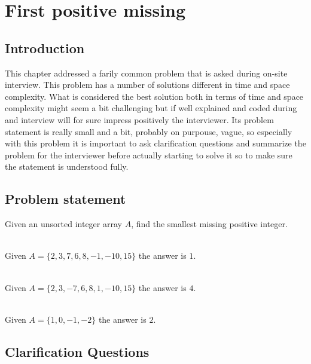 %

\chapter{First positive missing}
\label{ch:first_positive_missing}
\section*{Introduction}
This chapter addressed a farily common problem that is asked during on-site interview. This problem has a number of solutions different in time and space complexity. What is considered the best solution both in terms of time and space complexity might seem a bit challenging but if well explained and coded during and interview will for sure impress positively the interviewer. 
Its problem statement is really small and a bit, probably on purpouse, vague, so especially with this problem it is important to ask clarification questions and summarize the problem for the interviewer before actually starting to solve it so to make sure the statement is understood fully.

\section{Problem statement}
\begin{exercise}
	Given an unsorted integer array $A$, find the smallest missing positive integer.
	
	
	\begin{example}
		\hfill \\
		Given $A=\{2, 3, 7, 6, 8, -1, -10, 15\}$ the answer is $1$.
	\end{example}
	
	\begin{example}
		\hfill \\
		Given $A=\{ 2, 3, -7, 6, 8, 1, -10, 15\}$ the answer is $4$.
	\end{example}
	
	\begin{example}
		\hfill \\
		Given $A=\{ 1, 0, -1, -2\}$ the answer is $2$.
	\end{example}
\end{exercise}
	
\section{Clarification Questions}

